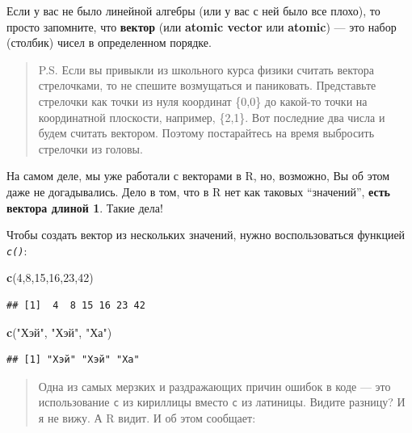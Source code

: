 \documentclass[]{book}
\newenvironment{Shaded}{\begin{snugshade}}{\end{snugshade}}
\newcommand{\DecValTok}[1]{\textcolor[rgb]{0.00,0.00,0.81}{#1}}
\newcommand{\KeywordTok}[1]{\textcolor[rgb]{0.13,0.29,0.53}{\textbf{#1}}}
\newcommand{\NormalTok}[1]{#1}
\newcommand{\StringTok}[1]{\textcolor[rgb]{0.31,0.60,0.02}{#1}}
\begin{document}
Если у вас не было линейной алгебры (или у вас с ней было все плохо), то просто запомните, что \textbf{вектор} (или \textbf{atomic vector} или \textbf{atomic}) --- это набор (столбик) чисел в определенном порядке.

\begin{quote}
P.S. Если вы привыкли из школьного курса физики считать вектора стрелочками, то не спешите возмущаться и паниковать. Представьте стрелочки как точки из нуля координат \{0,0\} до какой-то точки на координатной плоскости, например, \{2,1\}. Вот последние два числа и будем считать вектором. Поэтому постарайтесь на время выбросить стрелочки из головы.
\end{quote}

На самом деле, мы уже работали с векторами в R, но, возможно, Вы об этом даже не догадывались. Дело в том, что в R нет как таковых ``значений'', \textbf{есть вектора длиной 1}. Такие дела!

Чтобы создать вектор из нескольких значений, нужно воспользоваться функцией \emph{\texttt{c()}}:

\begin{Shaded}
\begin{Highlighting}[]
\KeywordTok{c}\NormalTok{(}\DecValTok{4}\NormalTok{,}\DecValTok{8}\NormalTok{,}\DecValTok{15}\NormalTok{,}\DecValTok{16}\NormalTok{,}\DecValTok{23}\NormalTok{,}\DecValTok{42}\NormalTok{)}
\end{Highlighting}
\end{Shaded}

\begin{verbatim}
## [1]  4  8 15 16 23 42
\end{verbatim}

\begin{Shaded}
\begin{Highlighting}[]
\KeywordTok{c}\NormalTok{(}\StringTok{"Хэй"}\NormalTok{, }\StringTok{"Хэй"}\NormalTok{, }\StringTok{"Ха"}\NormalTok{)}
\end{Highlighting}
\end{Shaded}

\begin{verbatim}
## [1] "Хэй" "Хэй" "Ха"
\end{verbatim}

\begin{quote}
Одна из самых мерзких и раздражающих причин ошибок в коде --- это использование \texttt{с} из кириллицы вместо \texttt{c} из латиницы. Видите разницу? И я не вижу. А R видит. И об этом сообщает:
\end{quote}
\end{document}
